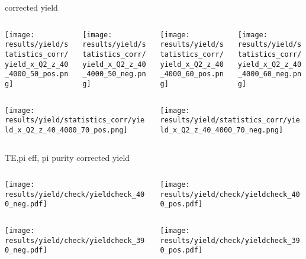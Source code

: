 \begin{frame}{corrected yield}
\begin{columns}
\begin{column}[T]{0.25\textwidth}
\texttt{[image: results/yield/statistics\_corr/yield\_x\_Q2\_z\_40\_4000\_50\_pos.png]}
\end{column}
\begin{column}[T]{0.25\textwidth}
\texttt{[image: results/yield/statistics\_corr/yield\_x\_Q2\_z\_40\_4000\_50\_neg.png]}
\end{column}
\begin{column}[T]{0.25\textwidth}
\texttt{[image: results/yield/statistics\_corr/yield\_x\_Q2\_z\_40\_4000\_60\_pos.png]}
\end{column}
\begin{column}[T]{0.25\textwidth}
\texttt{[image: results/yield/statistics\_corr/yield\_x\_Q2\_z\_40\_4000\_60\_neg.png]}
\end{column}
\end{columns}
\begin{columns}
\begin{column}[T]{0.25\textwidth}
\texttt{[image: results/yield/statistics\_corr/yield\_x\_Q2\_z\_40\_4000\_70\_pos.png]}
\end{column}
\begin{column}[T]{0.25\textwidth}
\texttt{[image: results/yield/statistics\_corr/yield\_x\_Q2\_z\_40\_4000\_70\_neg.png]}
\end{column}
\end{columns}
\end{frame}
\begin{frame}{TE,pi eff, pi purity corrected yield}
\begin{columns}
\begin{column}[T]{0.5\textwidth}
\texttt{[image: results/yield/check/yieldcheck\_400\_neg.pdf]}
\end{column}
\begin{column}[T]{0.5\textwidth}
\texttt{[image: results/yield/check/yieldcheck\_400\_pos.pdf]}
\end{column}
\end{columns}
\begin{columns}
\begin{column}[T]{0.5\textwidth}
\texttt{[image: results/yield/check/yieldcheck\_390\_neg.pdf]}
\end{column}
\begin{column}[T]{0.5\textwidth}
\texttt{[image: results/yield/check/yieldcheck\_390\_pos.pdf]}
\end{column}
\end{columns}
\end{frame}
